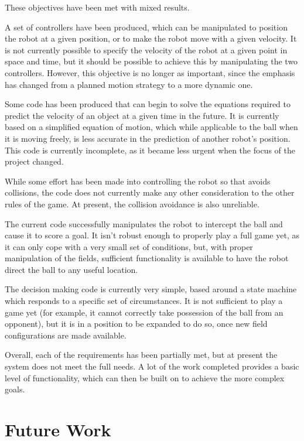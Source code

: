 \documentclass[10pt]{article}
\begin{document}
\cite{pplr}

These objectives have been met with mixed results.

A set of controllers have been produced, which can be manipulated to position
the robot at a given position, or to make the robot move with a given velocity.
It is not currently possible to specify the velocity of the robot at a given
point in space and time, but it should be possible to achieve this by
manipulating the two controllers.  However, this objective is no longer as
important, since the emphasis has changed from a planned motion strategy to a
more dynamic one.

Some code has been produced that can begin to solve the equations required to
predict the velocity of an object at a given time in the future.  It is
currently based on a simplified equation of motion, which while applicable to
the ball when it is moving freely, is less accurate in the prediction of another
robot's position.  This code is currently incomplete, as it became less urgent
when the focus of the project changed.

While some effort has been made into controlling the robot so that avoids
collisions, the code does not currently make any other consideration to the
other rules of the game.  At present, the collision avoidance is also
unreliable.

The current code successfully manipulates the robot to intercept the ball and
cause it to score a goal.  It isn't robust enough to properly play a full game
yet, as it can only cope with a very small set of conditions, but, with proper
manipulation of the fields, sufficient functionality is available to have the
robot direct the ball to any useful location.

The decision making code is currently very simple, based around a state machine
which responds to a specific set of circumstances.  It is not sufficient to play
a game yet (for example, it cannot correctly take possession of the ball from an
opponent), but it is in a position to be expanded to do so, once new field
configurations are made available.

Overall, each of the requirements has been partially met, but at present the
system does not meet the full needs.  A lot of the work completed provides a
basic level of functionality, which can then be built on to achieve the more
complex goals.

\section{Future Work}
\end{document}
